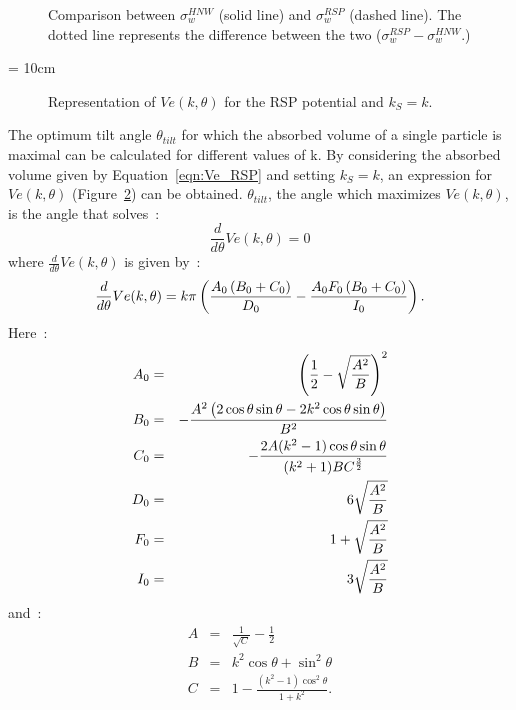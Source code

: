 \begin{figure}
	\centering
	\caption{Comparison between $\sigma^{HNW}_w$ (solid line) and $\sigma^{RSP}_w$ (dashed
	line). The dotted line represents the difference between the two 
	($\sigma^{RSP}_w-\sigma^{HNW}_w$.)}
	\label{fig:cmpHNW_RSP}
\end{figure}


\picW = 10cm
\begin{figure}
	\centering
	\caption{Representation of $Ve(k,\theta)$ for the RSP potential and $k_S=k$.}
	\label{fig:Ve_RSP_fk}
\end{figure}

The optimum tilt angle $\theta_{tilt}$ for which the absorbed volume of a single particle is 
maximal can be
calculated for different values of k.  By considering the absorbed volume given by 
Equation~\ref{eqn:Ve_RSP} and setting $k_S=k$, an expression
for $Ve(k,\theta)$ (Figure~\ref{fig:Ve_RSP_fk}) can be obtained.
$\theta_{tilt}$, the angle which maximizes $Ve(k,\theta)$, is the angle that
solves~:
\begin{equation}
	\frac{d}{d\theta}Ve(k,\theta) = 0
	\label{eqn:dVeEq}
\end{equation}
%
where $\frac{d}{d\theta}Ve(k,\theta)$ is given by~:
%
\begin{equation}
	\frac{d}{d\theta}Ve(k,\theta) = k\pi \left(\frac{A_0\left( B_0 + C_0 \right)}{D_0} 
	-\frac{A_0 F_0 \left( B_0 + C_0 \right)}{I_0} 
	\right).
\end{equation}
%
Here~:
%
\begin{eqnarray*}
	A_0 &=& \left( \frac{1}{2} - \sqrt{\frac{A^2}{B}} \right)^2	\\
	B_0 &=& -\frac{A^2\left(2\cos\theta\sin\theta - 2k^2\cos\theta\sin\theta\right)}{B^2}	\\
	C_0 &=& -\frac{2A(k^2-1)\cos\theta \sin\theta}{(k^2+1)BC^\frac{3}{2}}	\\
	D_0 &=& 6\sqrt{\frac{A^2}{B}}	\\
	F_0 &=& 1+\sqrt{\frac{A^2}{B}}	\\
	I_0 &=& 3\sqrt{\frac{A^2}{B}}
\end{eqnarray*}
%
and~:
%
\begin{eqnarray*}
	A &=& \frac{1}{\sqrt{C}} - \frac{1}{2}	\\
	B &=& k^2\cos\theta + \sin^2\theta	\\
	C &=& 1 - \frac{(k^2-1)\cos^2\theta}{1+k^2}.\\
\end{eqnarray*}

